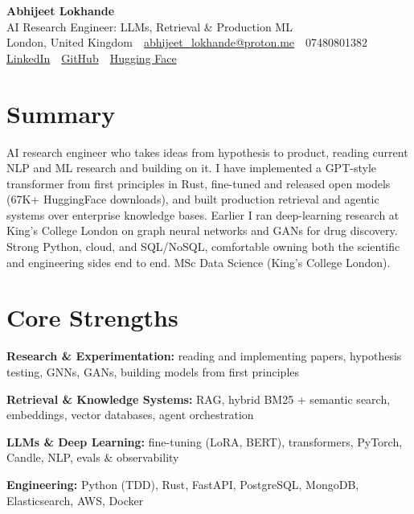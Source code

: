 \documentclass[10pt,a4paper]{article}
\newcommand{\sep}{\,\textcolor{accent!60}{\textbar}\,}
\begin{document}
\begin{center}
  {\fontsize{24}{26}\selectfont\bfseries Abhijeet Lokhande}\\[3pt]
  {\color{accent}\large AI Research Engineer: LLMs, Retrieval \& Production ML}\\[5pt]
  {\small
    London, United Kingdom \sep
    \href{mailto:abhijeet_lokhande@proton.me}{abhijeet\_lokhande@proton.me} \sep
    07480801382 \\[2pt]
    \href{https://www.linkedin.com/in/ablds/}{LinkedIn} \sep
    \href{https://github.com/abhijeetscode}{GitHub} \sep
    \href{https://huggingface.co/ab-ai}{Hugging Face}
  }
\end{center}
\vspace{2pt}

\section{Summary}
AI research engineer who takes ideas from hypothesis to product, reading current NLP and ML research and building on it. I have implemented a GPT-style transformer from first principles in Rust, fine-tuned and released open models (67K+ HuggingFace downloads), and built production retrieval and agentic systems over enterprise knowledge bases. Earlier I ran deep-learning research at King's College London on graph neural networks and GANs for drug discovery. Strong Python, cloud, and SQL/NoSQL, comfortable owning both the scientific and engineering sides end to end. MSc Data Science (King's College London).

\section{Core Strengths}
\begin{tight}
  \item[\textcolor{accent}{\small$\bullet$}] \textbf{Research \& Experimentation:} reading and implementing papers, hypothesis testing, GNNs, GANs, building models from first principles
  \item[\textcolor{accent}{\small$\bullet$}] \textbf{Retrieval \& Knowledge Systems:} RAG, hybrid BM25 + semantic search, embeddings, vector databases, agent orchestration
  \item[\textcolor{accent}{\small$\bullet$}] \textbf{LLMs \& Deep Learning:} fine-tuning (LoRA, BERT), transformers, PyTorch, Candle, NLP, evals \& observability
  \item[\textcolor{accent}{\small$\bullet$}] \textbf{Engineering:} Python (TDD), Rust, FastAPI, PostgreSQL, MongoDB, Elasticsearch, AWS, Docker
\end{tight}
\end{document}
